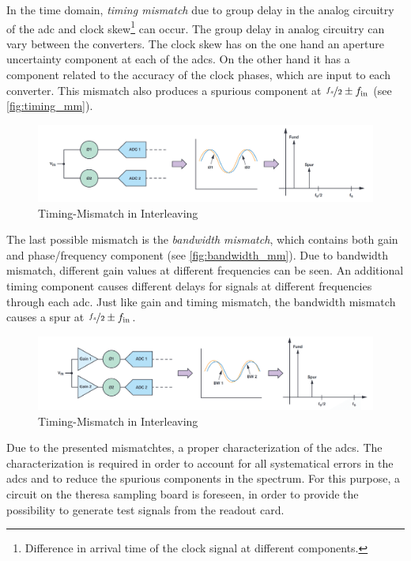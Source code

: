 In the time domain, \textit{timing mismatch} due to group delay in the analog circuitry of the \gls{adc} and clock skew\footnote{Difference in arrival time of the clock signal at different components.} can occur. %
The group delay in analog circuitry can vary between the converters. 
The clock skew has on the one hand an aperture uncertainty component at each of the \glspl{adc}. 
On the other hand it has a component related to the accuracy of the clock phases, which are input to each converter. \cite{Harris2019} 
This mismatch also produces a spurious component at $\nicefrac{f_s}{2} \pm f_\text{in}$ (see \autoref{fig:timing_mm}).

\begin{figure}[tbh]
	\centering
	\includegraphics[width = \textwidth]{chap/02-theory/img/timing_mm}
	\caption{Timing-Mismatch in Interleaving \cite{Harris2019}}
	\label{fig:timing_mm}
\end{figure}

The last possible mismatch is the \textit{bandwidth mismatch}, which contains both gain and phase/frequency component (see \autoref{fig:bandwidth_mm}). 
Due to bandwidth mismatch, different gain values at different frequencies can be seen. 
An additional timing component causes different delays for signals at different frequencies through each \gls{adc}. 
Just like gain and timing mismatch, the bandwidth mismatch causes a spur at $\nicefrac{f_s}{2} \pm f_\text{in}$.

\begin{figure}[tbh]
	\centering
	\includegraphics[width = \textwidth]{chap/02-theory/img/bandwidth_mm}
	\caption{Timing-Mismatch in Interleaving \cite{Harris2019}}
	\label{fig:bandwidth_mm}
\end{figure}

Due to the presented mismatchtes, a proper characterization of the \glspl{adc}.
The characterization is required in order to account for all systematical errors in the \glspl{adc} and to reduce the spurious components in the spectrum.
For this purpose, a circuit on the \gls{theresa} sampling board is foreseen, in order to provide the possibility to generate test signals from the readout card.

